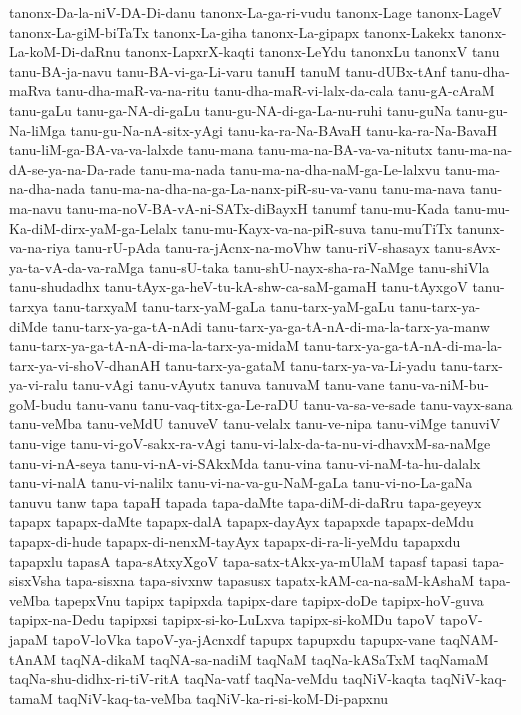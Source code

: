 {tanonx-Da-la-niV-DA-Di-danu
tanonx-La-ga-ri-vudu
tanonx-Lage
tanonx-LageV
tanonx-La-giM-biTaTx
tanonx-La-giha
tanonx-La-gipapx
tanonx-Lakekx
tanonx-La-koM-Di-daRnu
tanonx-LapxrX-kaqti
tanonx-LeYdu
tanonxLu
tanonxV
tanu
tanu-BA-ja-navu
tanu-BA-vi-ga-Li-varu
tanuH
tanuM
tanu-dUBx-tAnf
tanu-dha-maRva
tanu-dha-maR-va-na-ritu
tanu-dha-maR-vi-lalx-da-cala
tanu-gA-cAraM
tanu-gaLu
tanu-ga-NA-di-gaLu
tanu-gu-NA-di-ga-La-nu-ruhi
tanu-guNa
tanu-gu-Na-liMga
tanu-gu-Na-nA-sitx-yAgi
tanu-ka-ra-Na-BAvaH
tanu-ka-ra-Na-BavaH
tanu-liM-ga-BA-va-va-lalxde
tanu-mana
tanu-ma-na-BA-va-va-nitutx
tanu-ma-na-dA-se-ya-na-Da-rade
tanu-ma-nada
tanu-ma-na-dha-naM-ga-Le-lalxvu
tanu-ma-na-dha-nada
tanu-ma-na-dha-na-ga-La-nanx-piR-su-va-vanu
tanu-ma-nava
tanu-ma-navu
tanu-ma-noV-BA-vA-ni-SATx-diBayxH
tanumf
tanu-mu-Kada
tanu-mu-Ka-diM-dirx-yaM-ga-Lelalx
tanu-mu-Kayx-va-na-piR-suva
tanu-muTiTx
tanunx-va-na-riya
tanu-rU-pAda
tanu-ra-jAcnx-na-moVhw
tanu-riV-shasayx
tanu-sAvx-ya-ta-vA-da-va-raMga
tanu-sU-taka
tanu-shU-nayx-sha-ra-NaMge
tanu-shiVla
tanu-shudadhx
tanu-tAyx-ga-heV-tu-kA-shw-ca-saM-gamaH
tanu-tAyxgoV
tanu-tarxya
tanu-tarxyaM
tanu-tarx-yaM-gaLa
tanu-tarx-yaM-gaLu
tanu-tarx-ya-diMde
tanu-tarx-ya-ga-tA-nAdi
tanu-tarx-ya-ga-tA-nA-di-ma-la-tarx-ya-manw
tanu-tarx-ya-ga-tA-nA-di-ma-la-tarx-ya-midaM
tanu-tarx-ya-ga-tA-nA-di-ma-la-tarx-ya-vi-shoV-dhanAH
tanu-tarx-ya-gataM
tanu-tarx-ya-va-Li-yadu
tanu-tarx-ya-vi-ralu
tanu-vAgi
tanu-vAyutx
tanuva
tanuvaM
tanu-vane
tanu-va-niM-bu-goM-budu
tanu-vanu
tanu-vaq-titx-ga-Le-raDU
tanu-va-sa-ve-sade
tanu-vayx-sana
tanu-veMba
tanu-veMdU
tanuveV
tanu-velalx
tanu-ve-nipa
tanu-viMge
tanuviV
tanu-vige
tanu-vi-goV-sakx-ra-vAgi
tanu-vi-lalx-da-ta-nu-vi-dhavxM-sa-naMge
tanu-vi-nA-seya
tanu-vi-nA-vi-SAkxMda
tanu-vina
tanu-vi-naM-ta-hu-dalalx
tanu-vi-nalA
tanu-vi-nalilx
tanu-vi-na-va-gu-NaM-gaLa
tanu-vi-no-La-gaNa
tanuvu
tanw
tapa
tapaH
tapada
tapa-daMte
tapa-diM-di-daRru
tapa-geyeyx
tapapx
tapapx-daMte
tapapx-dalA
tapapx-dayAyx
tapapxde
tapapx-deMdu
tapapx-di-hude
tapapx-di-nenxM-tayAyx
tapapx-di-ra-li-yeMdu
tapapxdu
tapapxlu
tapasA
tapa-sAtxyXgoV
tapa-satx-tAkx-ya-mUlaM
tapasf
tapasi
tapa-sisxVsha
tapa-sisxna
tapa-sivxnw
tapasusx
tapatx-kAM-ca-na-saM-kAshaM
tapa-veMba
tapepxVnu
tapipx
tapipxda
tapipx-dare
tapipx-doDe
tapipx-hoV-guva
tapipx-na-Dedu
tapipxsi
tapipx-si-ko-LuLxva
tapipx-si-koMDu
tapoV
tapoV-japaM
tapoV-loVka
tapoV-ya-jAcnxdf
tapupx
tapupxdu
tapupx-vane
taqNAM-tAnAM
taqNA-dikaM
taqNA-sa-nadiM
taqNaM
taqNa-kASaTxM
taqNamaM
taqNa-shu-didhx-ri-tiV-ritA
taqNa-vatf
taqNa-veMdu
taqNiV-kaqta
taqNiV-kaq-tamaM
taqNiV-kaq-ta-veMba
taqNiV-ka-ri-si-koM-Di-papxnu
}
